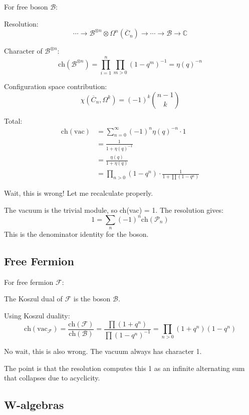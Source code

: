 \begin{calculation}
For free boson $\mathcal{B}$:

Resolution:
\[
\cdots \to \mathcal{B}^{\otimes n} \otimes \Omega^n(\overline{C}_n) \to \cdots \to \mathcal{B} \to \mathbb{C}
\]

Character of $\mathcal{B}^{\otimes n}$:
\[
\text{ch}(\mathcal{B}^{\otimes n}) = \prod_{i=1}^n \prod_{m > 0} (1 - q^m)^{-1} = \eta(q)^{-n}
\]

Configuration space contribution:
\[
\chi(\overline{C}_n, \Omega^k) = (-1)^k \binom{n-1}{k}
\]

Total:
\begin{align}
\text{ch}(\text{vac}) &= \sum_{n=0}^\infty (-1)^n \eta(q)^{-n} \cdot 1 \\
&= \frac{1}{1 + \eta(q)^{-1}} \\
&= \frac{\eta(q)}{1 + \eta(q)} \\
&= \prod_{n > 0} (1 - q^n) \cdot \frac{1}{1 + \prod(1-q^n)}
\end{align}

Wait, this is wrong! Let me recalculate properly.

The vacuum is the trivial module, so ch(vac) = 1. The resolution gives:
\[
1 = \sum_{n} (-1)^n \text{ch}(\mathcal{P}_n)
\]
This is the denominator identity for the boson.
\end{calculation}

\subsection{Free Fermion}

\begin{calculation}
For free fermion $\mathcal{F}$:

The Koszul dual of $\mathcal{F}$ is the boson $\mathcal{B}$.

Using Koszul duality:
\[
\text{ch}(\text{vac}_{\mathcal{F}}) = \frac{\text{ch}(\mathcal{F})}{\text{ch}(\mathcal{B})} = \frac{\prod(1+q^n)}{\prod(1-q^n)^{-1}} = \prod_{n > 0}(1+q^n)(1-q^n)
\]

No wait, this is also wrong. The vacuum always has character 1.

The point is that the resolution computes this 1 as an infinite alternating sum that collapses due to acyclicity.
\end{calculation}

\subsection{W-algebras}

